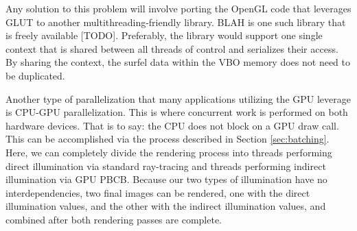 Any solution to this problem will involve porting the OpenGL code that leverages GLUT to another multithreading-friendly library. BLAH is one such library that is freely available [TODO]. Preferably, the library would support one single context that is shared between all threads of control and serializes their access. By sharing the context, the surfel data within the VBO memory does not need to be duplicated.

Another type of parallelization that many applications utilizing the GPU leverage is CPU-GPU parallelization. This is where concurrent work is performed on both hardware devices. That is to say: the CPU does not block on a GPU draw call. This can be accomplished via the process described in Section \ref{sec:batching}. Here, we can completely divide the rendering process into threads performing direct illumination via standard ray-tracing and threads performing indirect illumination via GPU PBCB. Because our two types of illumination have no interdependencies, two final images can be rendered, one with the direct illumination values, and the other with the indirect illumination values, and combined after both rendering passes are complete.

